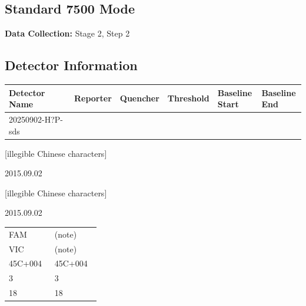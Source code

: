 \documentclass[UTF8,10pt,a4paper,fontset=fandol]{ctexart}
\newcommand{\fieldvalue}[1]{#1}
\newcommand{\handwritten}[1]{#1}
\begin{document}
\subsection*{Standard 7500 Mode}

\textbf{Data Collection:}
\fieldvalue{Stage 2, Step 2}

\subsection*{Detector Information}

\begin{tabular}{|p{0.25\linewidth}|p{0.15\linewidth}|p{0.15\linewidth}|p{0.15\linewidth}|p{0.15\linewidth}|p{0.15\linewidth}|}
\hline
\textbf{Detector Name} & \textbf{Reporter} & \textbf{Quencher} & \textbf{Threshold} & \textbf{Baseline Start} & \textbf{Baseline End} \\
\hline
\fieldvalue{20250902-H?P-sds}
&
&
&
&
&
\\
\hline
\end{tabular}

\handwritten{[illegible Chinese characters]}

\handwritten{2015.09.02}

\handwritten{[illegible Chinese characters]}

\handwritten{2015.09.02}

\newpage

\small
\begin{center}
\begin{tabular}{@{}p{0.45\linewidth}p{0.45\linewidth}@{}}
FAM & (note) \\
VIC & (note) \\
45C+004 & 45C+004 \\
3 & 3 \\
18 & 18 \\
\end{tabular}
\end{center}
\end{document}
